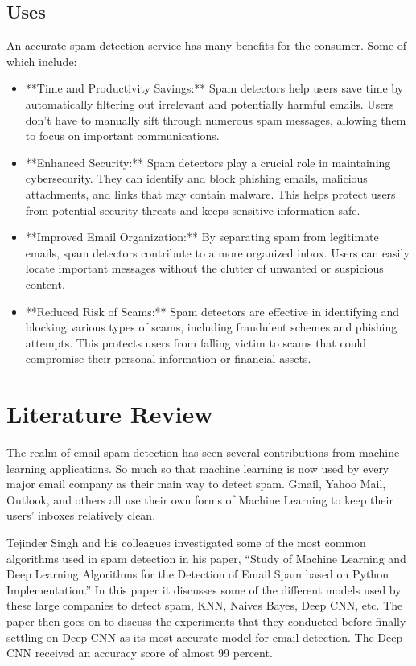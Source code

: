 \documentclass[10pt]{article}
\begin{document}
\subsection{Uses}
An accurate spam detection service has many benefits for the consumer. 
Some of which include:
 \begin{itemize}
     \item **Time and Productivity Savings:**
        Spam detectors help users save time by automatically filtering out irrelevant and potentially harmful emails. Users don't have to manually sift through numerous spam messages, allowing them to focus on important communications.
    \item **Enhanced Security:**
        Spam detectors play a crucial role in maintaining cybersecurity. They can identify and block phishing emails, malicious attachments, and links that may contain malware. This helps protect users from potential security threats and keeps sensitive information safe.
    \item **Improved Email Organization:**
        By separating spam from legitimate emails, spam detectors contribute to a more organized inbox. Users can easily locate important messages without the clutter of unwanted or suspicious content.
    \item **Reduced Risk of Scams:**
         Spam detectors are effective in identifying and blocking various types of scams, including fraudulent schemes and phishing attempts. This protects users from falling victim to scams that could compromise their personal information or financial assets.
 \end{itemize}

\newpage
\section{Literature Review}
The realm of email spam detection has seen several contributions from machine learning applications. So much so that machine learning is now used by every major email company as their main way to detect spam. Gmail, Yahoo Mail, Outlook, and others all use their own forms of Machine Learning to keep their users’ inboxes relatively clean.

Tejinder Singh and his colleagues investigated some of the most common algorithms used in spam detection in his paper, “Study of Machine Learning and Deep Learning Algorithms for the Detection of Email Spam based on Python Implementation.” In this paper it discusses some of the different models used by these large companies to detect spam, KNN, Naives Bayes, Deep CNN, etc. The paper then goes on to discuss the experiments that they conducted before finally settling on Deep CNN as its most accurate model for email detection. The Deep CNN received an accuracy score of almost 99 percent.
\end{document}
